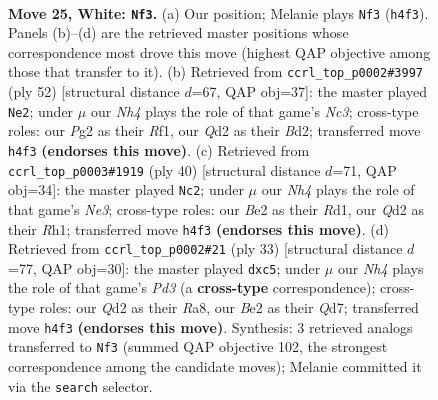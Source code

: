 \documentclass[11pt]{article}
\begin{document}
\clearpage

\begin{figure}[p]\centering
\begin{subfigure}{0.46\textwidth}\centering
\resizebox{\linewidth}{!}{%
\newchessgame
\chessboard[
  setfen={1rr3k1/1p1b1ppp/2n1pq2/2Pp3P/p2P3N/P1P5/R2QBPP1/2R2K2 w - - 7 25},
  showmover=false,
  pgfstyle=straightmove, color=movearrow, markmove={h4-f3}
]}
\caption{}
\end{subfigure}\hfill
\begin{subfigure}{0.46\textwidth}\centering
\resizebox{\linewidth}{!}{%
\newchessgame
\chessboard[
  setfen={1n2rrk1/1q4pp/p2ppp2/2p5/2PbPPPP/1PN2Q2/P2B2RK/5R2 w - - 2 27},
  showmover=false,
  pgfstyle=straightmove, color=movearrow, markmove={c3-e2}
]}
\caption{}
\end{subfigure}
\\[4pt]
\begin{subfigure}{0.46\textwidth}\centering
\resizebox{\linewidth}{!}{%
\newchessgame
\chessboard[
  setfen={1r3rk1/1p3p2/2bpn1p1/4p2p/p1P1Pq1P/3BNP2/PP1Q2P1/1K1R3R w - - 4 21},
  showmover=false,
  pgfstyle=straightmove, color=movearrow, markmove={e3-c2}
]}
\caption{}
\end{subfigure}\hfill
\begin{subfigure}{0.46\textwidth}\centering
\resizebox{\linewidth}{!}{%
\newchessgame
\chessboard[
  setfen={r5k1/pp1q1rbp/2np2p1/2PNpp2/2P5/P2PP1P1/1B3P1P/R2Q1RK1 b - - 0 17},
  showmover=false,
  pgfstyle=straightmove, color=movearrow, markmove={d6-c5}
]}
\caption{}
\end{subfigure}
\caption{\textbf{Move 25, White: \texttt{Nf3}.} (a) Our position; Melanie plays \texttt{Nf3} (\texttt{h4f3}). Panels (b)--(d) are the retrieved master positions whose correspondence most drove this move (highest QAP objective among those that transfer to it). (b) Retrieved from \texttt{ccrl\_top\_p0002\#3997} (ply 52) [structural distance $d$=67, QAP obj=37]: the master played \texttt{Ne2}; under $\mu$ our \emph{Nh4} plays the role of that game's \emph{Nc3}; cross-type roles: our \emph{P}g2 as their \emph{R}f1, our \emph{Q}d2 as their \emph{B}d2; transferred move \texttt{h4f3} \textbf{(endorses this move)}. (c) Retrieved from \texttt{ccrl\_top\_p0003\#1919} (ply 40) [structural distance $d$=71, QAP obj=34]: the master played \texttt{Nc2}; under $\mu$ our \emph{Nh4} plays the role of that game's \emph{Ne3}; cross-type roles: our \emph{B}e2 as their \emph{R}d1, our \emph{Q}d2 as their \emph{R}h1; transferred move \texttt{h4f3} \textbf{(endorses this move)}. (d) Retrieved from \texttt{ccrl\_top\_p0002\#21} (ply 33) [structural distance $d$=77, QAP obj=30]: the master played \texttt{dxc5}; under $\mu$ our \emph{Nh4} plays the role of that game's \emph{Pd3} (a \textbf{cross-type} correspondence); cross-type roles: our \emph{Q}d2 as their \emph{R}a8, our \emph{B}e2 as their \emph{Q}d7; transferred move \texttt{h4f3} \textbf{(endorses this move)}. Synthesis: 3 retrieved analogs transferred to \texttt{Nf3} (summed QAP objective 102, the strongest correspondence among the candidate moves); Melanie committed it via the \texttt{search} selector.}
\label{fig:thought-m48}
\end{figure}
\end{document}
